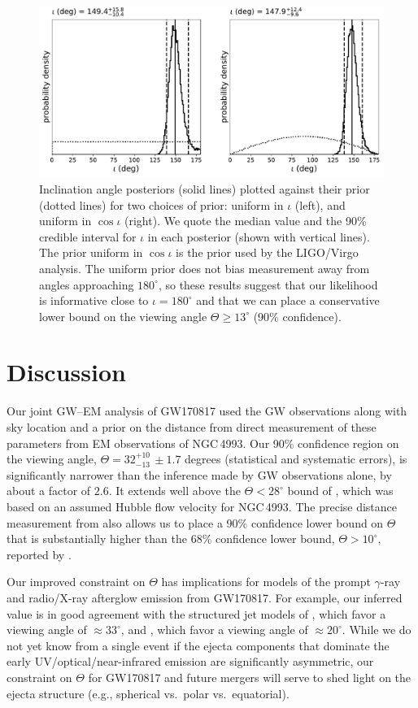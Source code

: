 \begin{figure}[ht]
\includegraphics[width=\textwidth]{Figures/inc-angle/inc_post_vs_prior.pdf}
\caption{Inclination angle posteriors (solid lines) plotted against their prior (dotted lines) for two choices of prior: uniform in $\iota$ (left), and uniform in $\cos \iota$ (right). We quote the median value and the 90\% credible interval for $\iota$ in each posterior (shown with vertical lines). The prior uniform in $\cos \iota$ is the prior used by the LIGO/Virgo analysis. The uniform prior does not bias measurement away from angles approaching $180^\circ$, so these results suggest that our likelihood is informative close to $\iota = 180^\circ$ and that we can place a conservative lower bound on the viewing angle $\Theta \ge 13^\circ$ (90\% confidence).}
\label{fig:inc}
\end{figure}

\section{Discussion} \label{sec:disc}

Our joint GW--EM analysis of GW170817 used the GW observations along with sky location and a prior on the distance from direct measurement of these parameters from EM observations of NGC\,4993. Our 90\% confidence region on the viewing angle, $\Theta = 32^{+10}_{-13}\, \pm 1.7$ degrees (statistical and systematic errors), is significantly narrower than the inference made by GW observations alone, by about a factor of $2.6$.  It extends well above the $\Theta < 28^\circ$ bound of \cite{Mandel:2017fwk}, which was based on an assumed Hubble flow velocity for NGC\,4993. The precise distance measurement from \cite{Cantiello:2018ffy} also allows us to place a 90\% confidence lower bound on $\Theta$ that is substantially higher than the 68\% confidence lower bound, $\Theta > 10^\circ$, reported by \cite{Mandel:2017fwk}. 

Our improved constraint on $\Theta$ has implications for models of the prompt $\gamma$-ray and radio/X-ray afterglow emission from GW170817.  For example, our inferred value is in good agreement with the structured jet models of \cite{Lazzati:2017zsj}, which favor a viewing angle of $\approx 33^\circ$, and \cite{Margutti:2018xqd}, which favor a viewing angle of $\approx 20^\circ$.  While we do not yet know from a single event if the ejecta components that dominate the early UV/optical/near-infrared emission are significantly asymmetric, our constraint on $\Theta$ for GW170817 and future mergers will serve to shed light on the ejecta structure (e.g., spherical vs.~polar vs.~equatorial).


